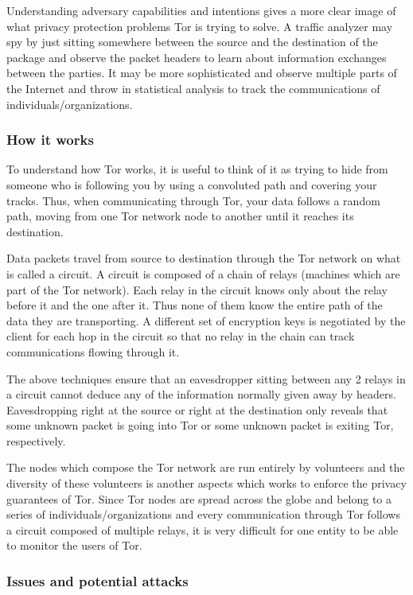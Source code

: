 \documentclass[11pt]{article} %
\begin{document}
Understanding adversary capabilities and intentions gives a more clear image of what privacy protection problems Tor is trying to solve. A traffic analyzer may spy by just sitting somewhere between the source and the destination of the package and observe the packet headers to learn about information exchanges between the parties. It may be more sophisticated and observe multiple parts of the Internet and throw in statistical analysis to track the communications of individuals/organizations.

\subsubsection{How it works}

To understand how Tor works, it is useful to think of it as trying to hide from someone who is following you by using a convoluted path and covering your tracks. Thus, when communicating through Tor, your data follows a random path, moving from one Tor network node to another until it reaches its destination.

Data packets travel from source to destination through the Tor network on what is called a circuit. A circuit is composed of a chain of relays (machines which are part of the Tor network). Each relay in the circuit knows only about the relay before it and the one after it. Thus none of them know the entire path of the data they are transporting. A different set of encryption keys is negotiated by the client for each hop in the circuit so that no relay in the chain can track communications flowing through it. 

The above techniques ensure that an eavesdropper sitting between any 2 relays in a circuit cannot deduce any of the information normally given away by headers. Eavesdropping right at the source or right at the destination only reveals that some unknown packet is going into Tor or some unknown packet is exiting Tor, respectively.

The nodes which compose the Tor network are run entirely by volunteers and the diversity of these volunteers is another aspects which works to enforce the privacy guarantees of Tor. Since Tor nodes are spread across the globe and belong to a series of individuals/organizations and every communication through Tor follows a circuit composed of multiple relays, it is very difficult for one entity to be able to monitor the users of Tor.

\subsubsection{Issues and potential attacks}
\end{document}
